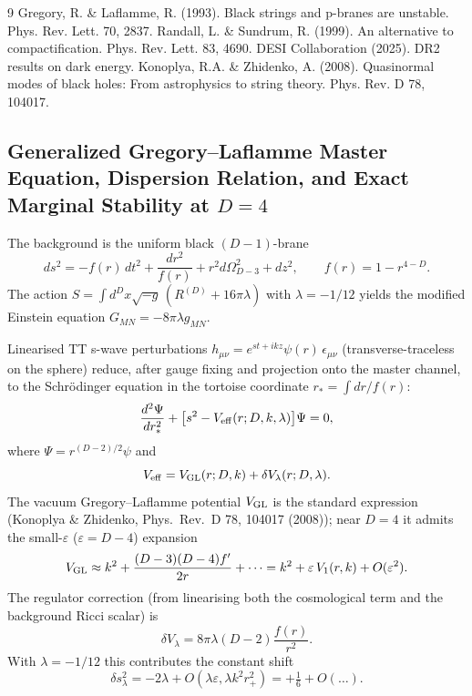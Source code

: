 \documentclass[11pt,a4paper,oneside]{article}
\begin{document}

\begin{thebibliography}{9}
 Gregory, R. \& Laflamme, R. (1993). Black strings and p-branes are unstable. Phys. Rev. Lett. 70, 2837.
 Randall, L. \& Sundrum, R. (1999). An alternative to compactification. Phys. Rev. Lett. 83, 4690.
 DESI Collaboration (2025). DR2 results on dark energy.
 Konoplya, R.A. \& Zhidenko, A. (2008). Quasinormal modes of black holes: From astrophysics to string theory. Phys. Rev. D 78, 104017.
\end{thebibliography}

\begin{appendices}

\section{Generalized Gregory--Laflamme Master Equation, Dispersion Relation, and Exact Marginal Stability at $D=4$}
\label{app:GL}

The background is the uniform black $(D-1)$-brane
\[
ds^2 = -f(r)\,dt^2 + \frac{dr^2}{f(r)} + r^2 d\Omega_{D-3}^2 + dz^2,\qquad f(r)=1-r^{4-D}.
\]
The action $S=\int d^Dx\sqrt{-g}\,(R^{(D)}+16\pi\lambda)$ with $\lambda=-1/12$ yields the modified Einstein equation $G_{MN}=-8\pi\lambda g_{MN}$.

Linearised TT s-wave perturbations $h_{\mu\nu}=e^{st+ikz}\psi(r)\,\epsilon_{\mu\nu}$ (transverse-traceless on the sphere) reduce, after gauge fixing and projection onto the master channel, to the Schrödinger equation in the tortoise coordinate $r_*=\int dr/f(r)$:
\[
\frac{d^2\Psi}{dr_*^2} + \bigl[s^2 - V_{\rm eff}(r;D,k,\lambda)\bigr]\Psi=0,
\]
where $\Psi=r^{(D-2)/2}\psi$ and
\[
V_{\rm eff}=V_{\rm GL}(r;D,k)+\delta V_\lambda(r;D,\lambda).
\]
The vacuum Gregory--Laflamme potential $V_{\rm GL}$ is the standard expression (Konoplya \& Zhidenko, Phys.\ Rev.\ D 78, 104017 (2008)); near $D=4$ it admits the small-$\varepsilon$ ($\varepsilon=D-4$) expansion
\[
V_{\rm GL}\approx k^2 + \frac{(D-3)(D-4)f'}{2r} + \cdots = k^2 + \varepsilon\,V_1(r,k) + O(\varepsilon^2).
\]
The regulator correction (from linearising both the cosmological term and the background Ricci scalar) is
\[
\delta V_\lambda=8\pi\lambda(D-2)\frac{f(r)}{r^2}.
\]
With $\lambda=-1/12$ this contributes the constant shift
\[
\delta s^2_\lambda=-2\lambda + O(\lambda\varepsilon,\lambda k^2 r_+^2)=+\tfrac{1}{6}+O(\ldots).
\]


\end{appendices}
\end{document}
